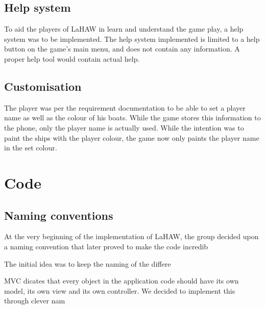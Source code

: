 \subsection{Help system}
To aid the players of LaHAW in learn and understand the game play, a help system was to be implemented. The help system implemented is limited to a help button on the game's main menu, and does not contain any information. A proper help tool would contain actual help.

\subsection{Customisation}
The player was per the requirement documentation to be able to set a player name as well as the colour of his boats. While the game stores this information to the phone, only the player name is actually used. While the intention was to paint the ships with the player colour, the game now only paints the player name in the set colour.



\section{Code}

\subsection{Naming conventions}
At the very beginning of the implementation of LaHAW, the group decided upon a naming convention that later proved to make the code incredib


The initial idea was to keep the naming of the differe


MVC dicates that every object in the application code should have its own model, its own view and its own controller. We decided to implement this through clever nam